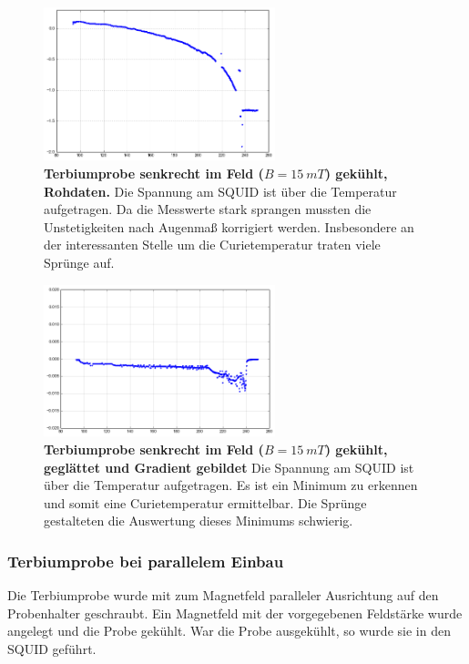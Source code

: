 \documentclass[a4paper,ngerman]{scrartcl}
\begin{document}
\begin{figure}
\centering
\includegraphics[width=0.6\textwidth]{abbildungen/Tb_sr_150.png}
\caption[Terbiumprobe senkrecht bei 15mT]{\textbf{Terbiumprobe senkrecht im Feld ($B = \SI{15}{mT}$) gekühlt, Rohdaten.} 
Die Spannung am SQUID ist über die Temperatur aufgetragen. 
Da die Messwerte stark sprangen mussten die Unstetigkeiten nach Augenmaß korrigiert werden.
Insbesondere an der interessanten Stelle um die Curietemperatur traten viele Sprünge auf.}
\label{fig:Tb_sr_15}
\end{figure}




\begin{figure}
\centering
\includegraphics[width=0.6\textwidth]{abbildungen/Tb_sr_150_grad.png}
\caption[Terbiumprobe senkrecht bei Nullfeld]{\textbf{Terbiumprobe senkrecht im Feld ($B = \SI{15}{mT}$) gekühlt, geglättet und Gradient gebildet} 
Die Spannung am SQUID ist über die Temperatur aufgetragen. 
Es ist ein Minimum zu erkennen und somit eine Curietemperatur ermittelbar.
Die Sprünge gestalteten die Auswertung dieses Minimums schwierig.}
\label{fig:Tb_sr_15_grad}
\end{figure}


\subsubsection{Terbiumprobe bei parallelem Einbau}

Die Terbiumprobe wurde mit zum Magnetfeld paralleler Ausrichtung auf den Probenhalter geschraubt. 
Ein Magnetfeld mit der vorgegebenen Feldstärke wurde angelegt und die Probe gekühlt.
War die Probe ausgekühlt, so wurde sie in den SQUID geführt.
\end{document}
